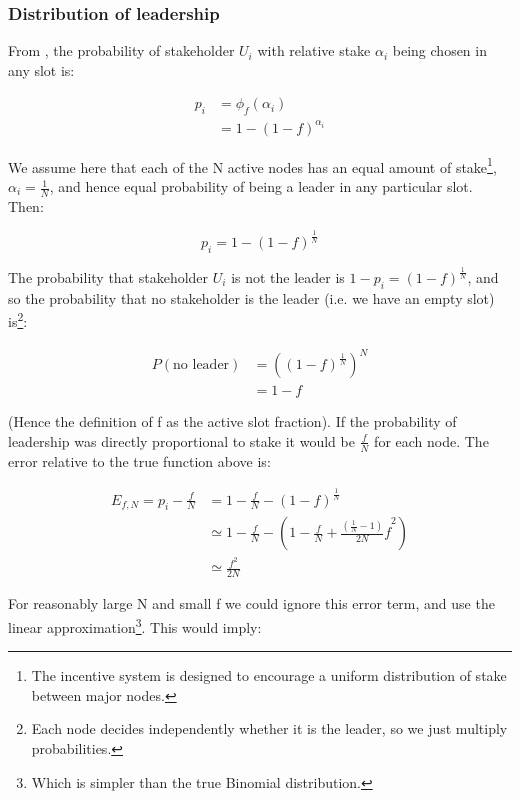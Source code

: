 \documentclass[11pt,a4paper]{article}
\begin{document}
\subsubsection{Distribution of leadership}
\label{distribution-of-leadership}

From \cite{BGKR17}, the probability of stakeholder $U_i$
with relative stake $\alpha_{i}$ being chosen in any slot is:

\begin{align*}
p_{i} &= \phi_{f}(\alpha_{i}) \\
      &= 1 - (1 - f)^{\alpha_{i}}
\end{align*}

We assume here that each of the N active nodes has an equal amount of
stake\footnote{The incentive system is designed to encourage a uniform
 distribution of stake between major nodes.},
$\alpha_{i} = \frac{1}{N}$, and hence equal probability of being a
leader in any particular slot. Then:

\begin{equation*}
p_i = 1 - (1 - f)^\frac{1}{N}
\end{equation*}

The probability that stakeholder $U_i$ is not the leader is
$1 - p_{i} = (1 - f)^\frac{1}{N}$, and so the
probability that no stakeholder is the leader (i.e. we have an empty
slot) is\footnote{Each node decides independently whether it is the
  leader, so we just multiply probabilities.}:

\begin{align*}
P(\text{no\ leader}) &= \left( (1 - f)^{\frac{1}{N}} \right)^{N} \\
                     &= 1 - f
\end{align*}

(Hence the definition of f as the active slot fraction). If the
probability of leadership was directly proportional to stake it would be
$\frac{f}{N}$ for each node. The error relative to the true function
above is:

\begin{align*}
E_{f,N} = p_{i} - \frac{f}{N}
  &= 1 - \frac{f}{N} - (1 - f)^{\frac{1}{N}} \\
  &\simeq 1 - \frac{f}{N} - \left( 1 - \frac{f}{N} + {\frac{(\frac{1}{N} - 1)}{2N}f}^{2} \right) \\
  &\simeq \frac{f^{2}}{2N}
\end{align*}

For reasonably large N and small f we could ignore this error term, and
use the linear approximation\footnote{Which is simpler than the true
  Binomial distribution.}. This would imply:
\end{document}
